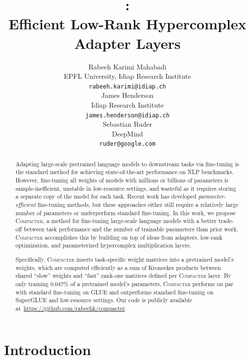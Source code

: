 \documentclass{article}
\title{\compacter: \\Efficient Low-Rank Hypercomplex Adapter Layers}
\author{Rabeeh Karimi Mahabadi \\
  EPFL University, Idiap Research Institute\\
  \texttt{rabeeh.karimi@idiap.ch} \\\And
  James Henderson \\
  Idiap Research Institute \\
  \texttt{james.henderson@idiap.ch}\\\And
  Sebastian Ruder \\
  DeepMind \\
  \texttt{ruder@google.com}
  }
\newcommand{\compacter}{\textsc{Compacter}\xspace}
\begin{document}
\maketitle

\begin{abstract}
Adapting large-scale pretrained language models to downstream tasks via fine-tuning is the standard method for achieving state-of-the-art performance on NLP benchmarks. However, fine-tuning all weights of models with millions or billions of parameters is sample-inefficient, unstable in low-resource settings, and wasteful as it requires storing a separate copy of the model for each task. Recent work has developed \emph{parameter-efficient} fine-tuning methods, 
but these approaches either still require a relatively large number of parameters or underperform standard fine-tuning. In this work, we propose \compacter, a method for fine-tuning large-scale language models with a better trade-off between task performance and the number of trainable parameters than prior work.
\compacter accomplishes this by building on top of ideas from adapters, low-rank optimization, and parameterized hypercomplex multiplication layers.

Specifically, \compacter inserts task-specific weight matrices into a pretrained model's weights, which are computed efficiently as a sum of Kronecker products between shared ``slow'' weights and ``fast'' rank-one matrices defined per \compacter layer. By only training $0.047\%$ of a pretrained model's parameters, \compacter performs on par with standard fine-tuning on GLUE and outperforms standard fine-tuning on SuperGLUE and low-resource settings. Our code is publicly available at~\url{https://github.com/rabeehk/compacter}. 
\end{abstract}

\section{Introduction}
\end{document}
